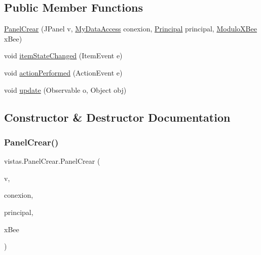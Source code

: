 \subsection*{Public Member Functions}
\begin{DoxyCompactItemize}
\item 
\mbox{\hyperlink{classvistas_1_1_panel_crear_aa70ba36abb988733928cb8f23c920262}{Panel\+Crear}} (J\+Panel v, \mbox{\hyperlink{classconexion_s_q_l_1_1_my_data_access}{My\+Data\+Access}} conexion, \mbox{\hyperlink{classvistas_1_1_principal}{Principal}} principal, \mbox{\hyperlink{classcomunicacion_1_1_modulo_x_bee}{Modulo\+X\+Bee}} x\+Bee)
\item 
void \mbox{\hyperlink{classvistas_1_1_panel_crear_a668d00abf12ad5a3f53ba063c6cc8d39}{item\+State\+Changed}} (Item\+Event e)
\item 
void \mbox{\hyperlink{classvistas_1_1_panel_crear_af3bd29f72641be17636321ed461373d9}{action\+Performed}} (Action\+Event e)
\item 
void \mbox{\hyperlink{classvistas_1_1_panel_crear_acf3b138f0c0c67c48a405b469eb37606}{update}} (Observable o, Object obj)
\end{DoxyCompactItemize}


\subsection{Constructor \& Destructor Documentation}
\mbox{\label{classvistas_1_1_panel_crear_aa70ba36abb988733928cb8f23c920262}} 
\subsubsection{\texorpdfstring{Panel\+Crear()}{PanelCrear()}}
{\footnotesize\ttfamily vistas.\+Panel\+Crear.\+Panel\+Crear (\begin{DoxyParamCaption}\item[{J\+Panel}]{v,  }\item[{\mbox{\hyperlink{classconexion_s_q_l_1_1_my_data_access}{My\+Data\+Access}}}]{conexion,  }\item[{\mbox{\hyperlink{classvistas_1_1_principal}{Principal}}}]{principal,  }\item[{\mbox{\hyperlink{classcomunicacion_1_1_modulo_x_bee}{Modulo\+X\+Bee}}}]{x\+Bee }\end{DoxyParamCaption})}

